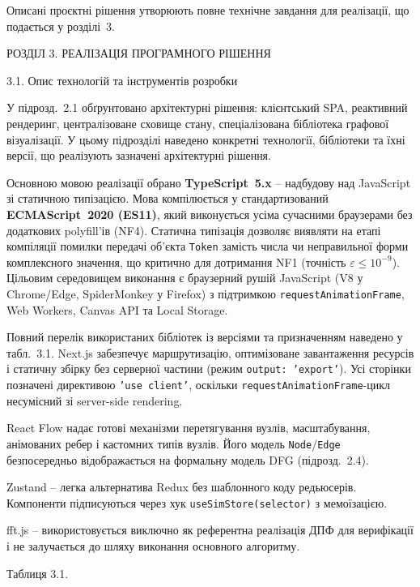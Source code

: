 \documentclass[
]{article}
\begin{document}
Описані проєктні рішення утворюють повне технічне завдання для
реалізації, що подається у розділі~3.

\protect{}\label{_Toc229681122}{}РОЗДІЛ 3. РЕАЛІЗАЦІЯ
ПРОГРАМНОГО РІШЕННЯ

\protect{}\label{_Toc229681123}{}3.1. Опис технологій та
інструментів розробки

У підрозд.~2.1 обґрунтовано архітектурні рішення: клієнтський SPA,
реактивний рендеринг, централізоване сховище стану, спеціалізована
бібліотека графової візуалізації. У цьому підрозділі наведено конкретні
технології, бібліотеки та їхні версії, що реалізують зазначені
архітектурні рішення.

Основною мовою реалізації обрано \textbf{TypeScript~5.x} -- надбудову
над JavaScript зі статичною типізацією. Мова компілюється у
стандартизований \textbf{ECMAScript~2020 (ES11)}, який виконується усіма
сучасними браузерами без додаткових polyfill'ів (NF4). Статична
типізація дозволяє виявляти на етапі компіляції помилки передачі об'єкта
\texttt{Token} замість числа чи неправильної форми комплексного
значення, що критично для дотримання NF1 (точність
\(\varepsilon \leq 10^{- 9}\)). Цільовим середовищем виконання є
браузерний рушій JavaScript (V8 у Chrome/Edge, SpiderMonkey у Firefox) з
підтримкою \texttt{requestAnimationFrame}, Web Workers, Canvas API та
Local Storage.

Повний перелік використаних бібліотек із версіями та призначенням
наведено у табл.~3.1. Next.js забезпечує маршрутизацію, оптимізоване
завантаження ресурсів і статичну збірку без серверної частини (режим
\texttt{output}\texttt{:\ ’}\texttt{export}\texttt{’}). Усі сторінки
позначені директивою
\texttt{’}\texttt{use}\texttt{\ }\texttt{client}\texttt{’}, оскільки
\texttt{requestAnimationFrame}-цикл несумісний зі server-side rendering.

React Flow надає готові механізми перетягування вузлів, масштабування,
анімованих ребер і кастомних типів вузлів. Його модель
\texttt{Node}/\texttt{Edge} безпосередньо відображається на формальну
модель DFG (підрозд.~2.4).

Zustand -- легка альтернатива Redux без шаблонного коду редьюсерів.
Компоненти підписуються через хук
\texttt{useSimStore}\texttt{(}\texttt{selector}\texttt{)} з мемоїзацією.

fft.js -- використовується виключно як референтна реалізація ДПФ для
верифікації і не залучається до шляху виконання основного алгоритму.

Таблиця 3.1.
\end{document}

